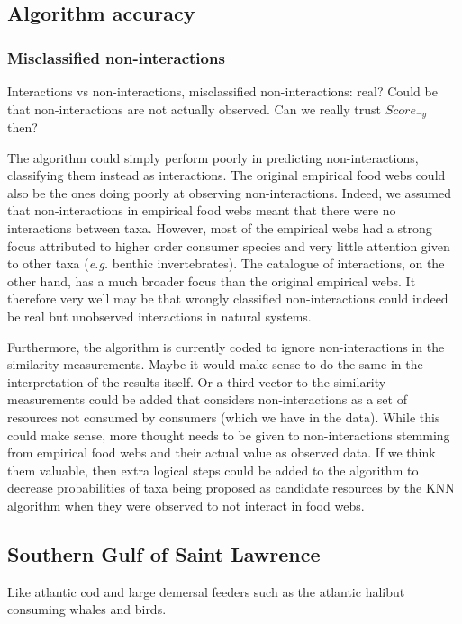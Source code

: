 \documentclass[letterpaper]{article}
\begin{document}
\subsection{Algorithm accuracy}
\subsubsection{Misclassified non-interactions}
Interactions vs non-interactions, misclassified non-interactions: real? Could be that non-interactions are not actually observed. Can we really trust $Score_{\neg y}$ then?

The algorithm could simply perform poorly in predicting non-interactions, classifying them instead as interactions. The original empirical food webs could also be the ones doing poorly at observing non-interactions. Indeed, we assumed that non-interactions in empirical food webs meant that there were no interactions between taxa. However, most of the empirical webs had a strong focus attributed to higher order consumer species and very little attention given to other taxa (\textit{e.g.} benthic invertebrates). The catalogue of interactions, on the other hand, has a much broader focus than the original empirical webs. It therefore very well may be that wrongly classified non-interactions could indeed be real but unobserved interactions in natural systems.

Furthermore, the algorithm is currently coded to ignore non-interactions in the similarity measurements. Maybe it would make sense to do the same in the interpretation of the results itself. Or a third vector to the similarity measurements could be added that considers non-interactions as a set of resources not consumed by consumers (which we have in the data). While this could make sense, more thought needs to be given to non-interactions stemming from empirical food webs and their actual value as observed data. If we think them valuable, then extra logical steps could be added to the algorithm to decrease probabilities of taxa being proposed as candidate resources by the KNN algorithm when they were observed to not interact in food webs.

\subsection{Southern Gulf of Saint Lawrence}


Like atlantic cod and large demersal feeders such as the atlantic halibut consuming whales and birds.
\end{document}
